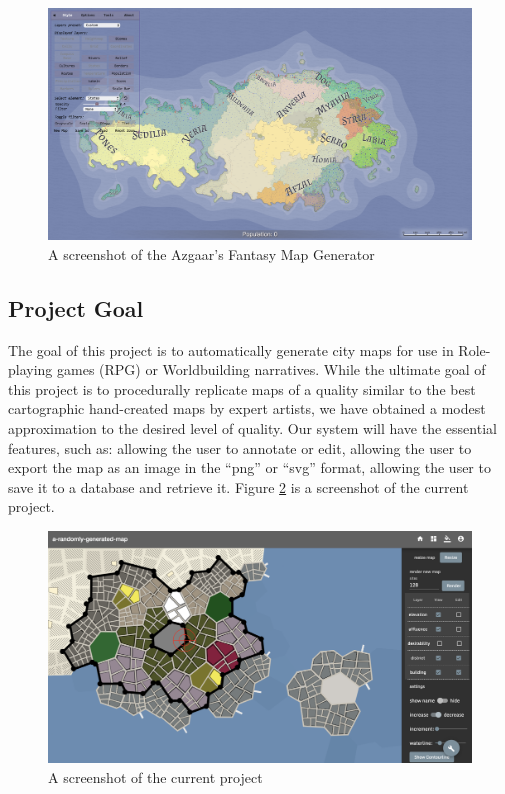 \begin{figure}[!htb]
\centering
\includegraphics[width=\textwidth]{section01/assets/screenshot_FMG.png}
\caption[A screenshot of the Azgaar's Fantasy Map Generator]{\label{fig:Screenshot FMG}A screenshot of the Azgaar's Fantasy Map Generator}
\end{figure}

\subsection{Project Goal}
\label{sec:Introduction>Project Goal}
The goal of this project is to automatically generate city maps for use in Role-playing games (RPG) or Worldbuilding narratives. While the ultimate goal of this project is to procedurally replicate maps of a quality similar to the best cartographic hand-created maps by expert artists, we have obtained a modest approximation to the desired level of quality. Our system will have the essential features, such as: allowing the user to annotate or edit, allowing the user to export the map as an image in the ``png'' or ``svg'' format, allowing the user to save it to a database and retrieve it. Figure \ref{fig:Screenshot Metropolist} is a screenshot of the current project.

\begin{figure}[!htb]
\centering
\includegraphics[width=\textwidth]{section01/assets/screenshot_Metropolist.png}
\caption[A screenshot of the current project]{\label{fig:Screenshot Metropolist}A screenshot of the current project}
\end{figure}
